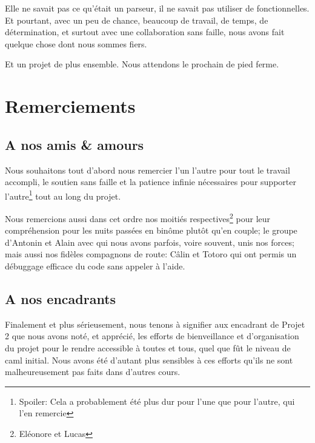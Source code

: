 \documentclass{article}
\begin{document}
	Elle ne savait pas ce qu'était un parseur, il ne savait pas utiliser de fonctionnelles. Et pourtant, avec un peu de chance, beaucoup de travail, de temps, de détermination, et surtout avec une collaboration sans faille, nous avons fait quelque chose dont nous sommes fiers. 
	
	Et un projet de plus ensemble. Nous attendons le prochain de pied ferme.
	
\section{Remerciements}
\subsection{A nos amis \& amours}
Nous souhaitons tout d'abord nous remercier l'un l'autre pour tout le travail accompli, le soutien sans faille et la patience infinie nécessaires pour supporter l'autre\footnote{Spoiler: Cela a probablement été plus dur pour l'une que pour l'autre, qui l'en remercie} tout au long du projet. 

Nous remercions aussi dans cet ordre nos moitiés respectives\footnote{Eléonore et Lucas} pour leur compréhension pour les nuits passées en binôme plutôt qu'en couple; le groupe d'Antonin et Alain avec qui nous avons parfois, voire souvent, unis nos forces; mais aussi nos fidèles compagnons de route: Câlin et Totoro qui ont permis un débuggage efficace du code sans appeler à l'aide.
\subsection{A nos encadrants}
Finalement et plus sérieusement, nous tenons à signifier aux encadrant de Projet 2 que nous avons noté, et apprécié, les efforts de bienveillance et d'organisation du projet pour le rendre accessible à toutes et tous, quel que fût le niveau de caml initial. Nous avons été d'autant plus sensibles à ces efforts qu'ils ne sont malheureusement pas faits dans d'autres cours.




\end{document}
